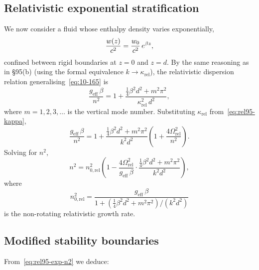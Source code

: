 \subsection{Relativistic exponential stratification}

We now consider a fluid whose enthalpy density varies exponentially,
\begin{equation}
  \frac{w(z)}{c^{2}}
    = \frac{w_{0}}{c^{2}}\,e^{\beta z},
  \label{eq:rel95-exp-strat}
\end{equation}
confined between rigid boundaries at $z=0$ and $z=d$.  By the same
reasoning as in \S95(b) (using the formal equivalence
$k\to\kappa_{\mathrm{rel}}$), the relativistic dispersion relation
generalising~\eqref{eq:10-165} is
\begin{equation}
  \frac{g_{\mathrm{eff}}\,\beta}{n^{2}}
    = 1 + \frac{\tfrac{1}{4}\beta^{2}d^{2}+m^{2}\pi^{2}}
               {\kappa_{\mathrm{rel}}^{2}\,d^{2}},
  \label{eq:rel95-exp-disp}
\end{equation}
where $m=1,2,3,\ldots$ is the vertical mode number.  Substituting
$\kappa_{\mathrm{rel}}$ from~\eqref{eq:rel95-kappa},
\begin{equation}
  \frac{g_{\mathrm{eff}}\,\beta}{n^{2}}
    = 1 + \frac{\tfrac{1}{4}\beta^{2}d^{2}+m^{2}\pi^{2}}{k^{2}d^{2}}
      \!\left(1+\frac{4\Omega_{\mathrm{rel}}^{2}}{n^{2}}\right).
  \label{eq:rel95-exp-disp2}
\end{equation}
Solving for $n^{2}$,
\begin{equation}
  \boxed{\;
  n^{2} = n_{0,\mathrm{rel}}^{2}\!
  \left(1 - \frac{4\Omega_{\mathrm{rel}}^{2}}{g_{\mathrm{eff}}\,\beta}
    \cdot\frac{\tfrac{1}{4}\beta^{2}d^{2}+m^{2}\pi^{2}}{k^{2}d^{2}}
  \right),\;}
  \label{eq:rel95-exp-n2}
\end{equation}
where
\begin{equation}
  n_{0,\mathrm{rel}}^{2}
    = \frac{g_{\mathrm{eff}}\,\beta}
           {1+(\tfrac{1}{4}\beta^{2}d^{2}+m^{2}\pi^{2})/(k^{2}d^{2})}
  \label{eq:rel95-n0rel}
\end{equation}
is the non-rotating relativistic growth rate.

\subsection{Modified stability boundaries}

From~\eqref{eq:rel95-exp-n2} we deduce:

